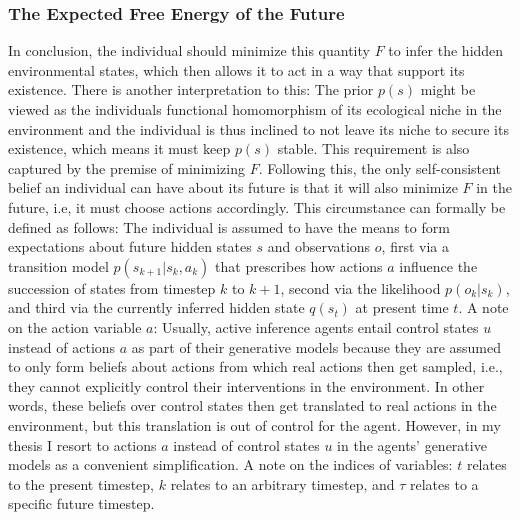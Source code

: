 \subsubsection{The Expected Free Energy of the Future}

In conclusion, the individual should minimize this quantity \(F\) to infer the hidden environmental states, which then allows it to act in a way that support its existence. There is another interpretation to this: The prior \(p(s)\) might be viewed as the individuals functional homomorphism of its ecological niche in the environment and the individual is thus inclined to not leave its niche to secure its existence, which means it must keep \(p(s)\) stable. This requirement is also captured by the premise of minimizing \(F\). Following this, the only self-consistent belief an individual can have about its future is that it will also minimize \(F\) in the future, i.e, it must choose actions accordingly. This circumstance can formally be defined as follows:
The individual is assumed to have the means to form expectations about future hidden states \(s\) and observations \(o\), first via a transition model \(p(s_{k+1}|s_k,a_k)\) that prescribes how actions \(a\) influence the succession of states from timestep \(k\) to \(k+1\), second via the likelihood \(p(o_k|s_k)\), and third via the currently inferred hidden state \(q(s_t)\) at present time \(t\). A note on the action variable \(a\): Usually, active inference agents entail control states \(u\) instead of actions \(a\) as part of their generative models because they are assumed to only form beliefs about actions from which real actions then get sampled, i.e., they cannot explicitly control their interventions in the environment. In other words, these beliefs over control states then get translated to real actions in the environment, but this translation is out of control for the agent. However, in my thesis I resort to actions \(a\) instead of control states \(u\) in the agents' generative models as a convenient simplification. A note on the indices of variables: \(t\) relates to the present timestep, \(k\) relates to an arbitrary timestep, and \(\tau\) relates to a specific future timestep.

